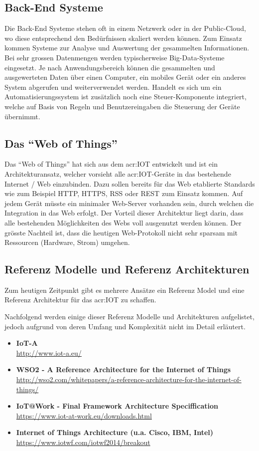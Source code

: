 \subsection{Back-End Systeme}
Die Back-End Systeme stehen oft in einem Netzwerk oder in der Public-Cloud, wo diese entsprechend den Bedürfnissen skaliert werden können. Zum Einsatz kommen Systeme zur Analyse und Auswertung der gesammelten Informationen. Bei sehr grossen Datenmengen werden typischerweise Big-Data-Systeme eingesetzt. Je nach Anwendungsbereich können die gesammelten und ausgewerteten Daten über einen Computer, ein mobiles Gerät oder ein anderes System abgerufen und weiterverwendet werden. Handelt es sich um ein Automatisierungssystem ist zusätzlich noch eine Steuer-Komponente integriert, welche auf Basis von Regeln und Benutzereingaben die Steuerung der Geräte übernimmt.


\subsection{Das "`Web of Things"'}
Das "`Web of Things"' hat sich aus dem \gls{acr:IOT} entwickelt und ist ein Architekturansatz, welcher vorsieht alle \gls{acr:IOT}-Geräte in das bestehende Internet / Web einzubinden. Dazu sollen bereits für das Web etablierte Standards wie zum Beispiel HTTP, HTTPS, RSS oder REST zum Einsatz kommen. Auf jedem Gerät müsste ein minimaler Web-Server vorhanden sein, durch welchen die Integration in das Web erfolgt. Der Vorteil dieser Architektur liegt darin, dass alle bestehenden Möglichkeiten des Webs voll ausgenutzt werden können. Der grösste Nachteil ist, dass die heutigen Web-Protokoll nicht sehr sparsam mit Ressourcen (Hardware, Strom) umgehen.

\subsection{Referenz Modelle und Referenz Architekturen}
Zum heutigen Zeitpunkt gibt es  mehrere Ansätze ein Referenz Model und eine Referenz Architektur für das \gls{acr:IOT} zu schaffen.

Nachfolgend werden einige dieser Referenz Modelle und Architekturen aufgelistet, jedoch aufgrund von deren Umfang und Komplexität nicht im Detail erläutert.

\begin{itemize}
\item \textbf{IoT-A}\\
\url{http://www.iot-a.eu/}
\item \textbf{WSO2 - A Reference Architecture for the Internet of Things}\\
\url{http://wso2.com/whitepapers/a-reference-architecture-for-the-internet-of-things/}
\item \textbf{IoT@Work - Final Framework Architecture Speciffication}\\
\url{https://www.iot-at-work.eu/downloads.html}
\item \textbf{Internet of Things Architecture (u.a. Cisco, IBM, Intel)}\\
\url{https://www.iotwf.com/iotwf2014/breakout}
\end{itemize}


